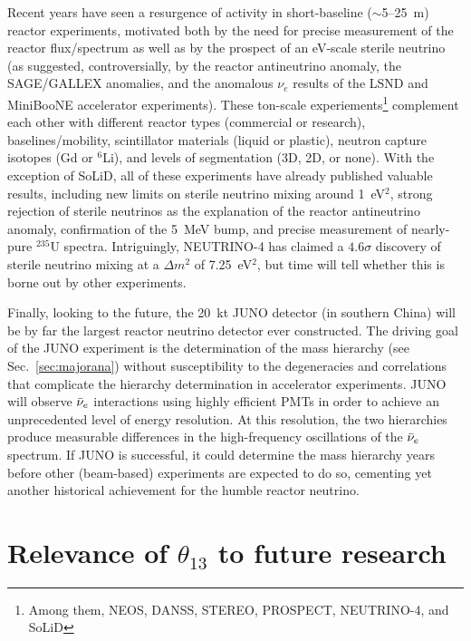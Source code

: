 \documentclass[../thesis.tex]{subfiles}
\begin{document}
Recent years have seen a resurgence of activity in short-baseline
($\sim$5--25~m) reactor experiments, motivated both by the need for precise
measurement of the reactor flux/spectrum as well as by the prospect of an
eV-scale sterile neutrino (as suggested, controversially, by the reactor
antineutrino anomaly, the SAGE/GALLEX anomalies, and the anomalous $\nu_e$
results of the LSND and MiniBooNE accelerator experiments). These ton-scale
experiements\footnote{Among them, NEOS, DANSS, STEREO, PROSPECT, NEUTRINO-4, and
  SoLiD} complement each other with different reactor types (commercial or
research), baselines/mobility, scintillator materials (liquid or plastic),
neutron capture isotopes (Gd or $^6$Li), and levels of segmentation (3D, 2D, or
none). With the exception of SoLiD, all of these experiments have already
published valuable results, including new limits on sterile neutrino mixing
around 1~eV$^2$, strong rejection of sterile neutrinos as the explanation of the
reactor antineutrino anomaly, confirmation of the 5~MeV bump, and precise
measurement of nearly-pure $^{235}$U spectra. Intriguingly, NEUTRINO-4 has
claimed a $4.6\sigma$ discovery of sterile neutrino mixing at a $\Delta m^2$ of
7.25~eV$^2$, but time will tell whether this is borne out by other experiments.

Finally, looking to the future, the 20~kt JUNO detector (in southern China) will
be by far the largest reactor neutrino detector ever constructed. The driving
goal of the JUNO experiment is the determination of the mass hierarchy (see
Sec.~\ref{sec:majorana}) without susceptibility to the degeneracies and
correlations that complicate the hierarchy determination in accelerator
experiments. JUNO will observe $\bar\nu_e$ interactions using highly efficient
PMTs in order to achieve an unprecedented level of energy resolution. At this
resolution, the two hierarchies produce measurable differences in the
high-frequency oscillations of the $\bar\nu_e$ spectrum. If JUNO is successful,
it could determine the mass hierarchy years before other (beam-based)
experiments are expected to do so, cementing yet another historical achievement
for the humble reactor neutrino.

\section{Relevance of $\theta_{13}$ to future research}
\label{sec:futureRelevance}
\end{document}
